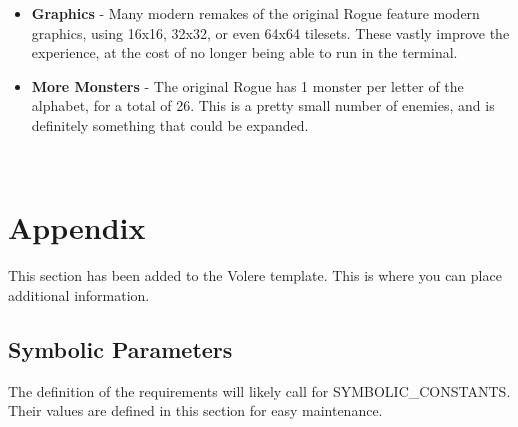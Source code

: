 \documentclass[12pt, titlepage]{article}
\begin{document}
		\begin{itemize}
			\item \textbf{Graphics} - Many modern remakes of the original Rogue feature modern graphics, using 16x16, 32x32, or even 64x64 tilesets. These vastly improve the experience, at the cost of no longer being able to run in the terminal.
			\item \textbf{More Monsters} - The original Rogue has 1 monster per letter of the alphabet, for a total of 26. This is a pretty small number of enemies, and is definitely something that could be expanded.
		\end{itemize}

\newpage

\





\newpage

\section{Appendix}

This section has been added to the Volere template.  This is where you can place
additional information.

	\subsection{Symbolic Parameters}

	The definition of the requirements will likely call for SYMBOLIC\_CONSTANTS.
	Their values are defined in this section for easy maintenance.
\end{document}
